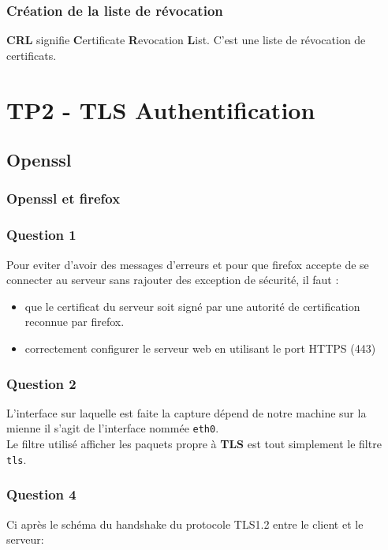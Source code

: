 \documentclass[12pt, a4paper]{article}
\begin{document}
    \subsubsection{Création de la liste de révocation}
    \textbf{CRL} signifie \textbf{C}ertificate \textbf{R}evocation \textbf{L}ist. C'est une liste de révocation de certificats.\\


\newpage
\section{TP2 - TLS Authentification}
\subsection{Openssl}
\subsubsection{Openssl et firefox}
\subsubsection*{Question 1}
Pour eviter d'avoir des messages d'erreurs et pour que firefox accepte de se connecter au serveur
sans rajouter des exception de sécurité, il faut :\\

\begin{itemize}
    \item que le certificat du serveur soit signé par une autorité de certification reconnue par firefox.
    \item correctement configurer le serveur web en utilisant le port HTTPS (443)
\end{itemize}

\subsubsection*{Question 2}
L'interface sur laquelle  est faite la capture dépend de notre machine sur la mienne il 
s'agit de l'interface nommée \texttt{eth0}.\\
Le filtre utilisé afficher les paquets propre à \textbf{TLS} est tout simplement le filtre 
\texttt{tls}.

\subsubsection*{Question 4}
Ci après le schéma du handshake du protocole TLS1.2 entre le client et le serveur: 
\end{document}
